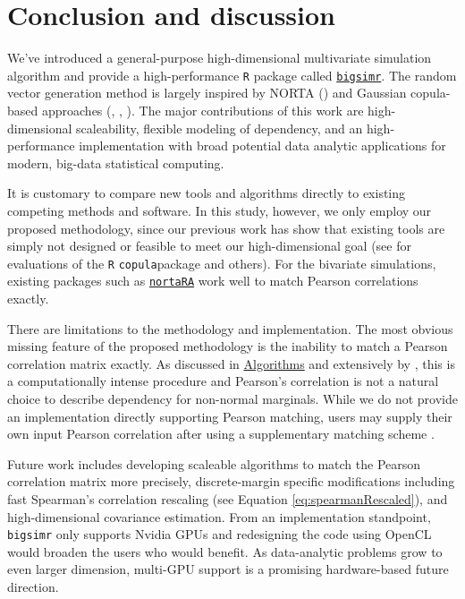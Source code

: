 \documentclass[]{article}
\begin{document}
\hypertarget{discussion}{%
\section{Conclusion and discussion}\label{discussion}}

We've introduced a general-purpose high-dimensional multivariate simulation algorithm and provide a high-performance \texttt{R} package called \href{https://schisslergroup.github.io/bigsimr/}{\texttt{bigsimr}}.
The random vector generation method is largely inspired by NORTA (\citet{Cario1997}) and Gaussian copula-based approaches (\citet{MB13}, \citet{BF17}, \citet{Xia17}).
The major contributions of this work are high-dimensional scaleability, flexible modeling of dependency, and an high-performance implementation with broad potential data analytic applications for modern, big-data statistical computing.

It is customary to compare new tools and algorithms directly to existing competing methods and software.
In this study, however, we only employ our proposed methodology, since our previous work has show that existing tools are simply not designed or feasible to meet our high-dimensional goal (see \citet{Li2019gpu} for evaluations of the \texttt{R} \texttt{copula}package and others).
For the bivariate simulations, existing packages such as \href{https://github.com/cran/NORTARA/blob/master/inst/doc/NORTARA.R}{\texttt{nortaRA}} work well to match Pearson correlations exactly.

There are limitations to the methodology and implementation.
The most obvious missing feature of the proposed methodology is the inability to match a Pearson correlation matrix exactly.
As discussed in \href{algorithms}{Algorithms} and extensively by \citet{XZ19}, this is a computationally intense procedure and Pearson's correlation is not a natural choice to describe dependency for non-normal marginals.
While we do not provide an implementation directly supporting Pearson matching, users may supply their own input Pearson correlation after using a supplementary matching scheme \citep{Cario1997, XZ19}.

Future work includes developing scaleable algorithms to match the Pearson correlation matrix more precisely, discrete-margin specific modifications including fast Spearman's correlation rescaling (see Equation \eqref{eq:spearmanRescaled}), and high-dimensional covariance estimation.
From an implementation standpoint, \texttt{bigsimr} only supports Nvidia GPUs and redesigning the code using OpenCL would broaden the users who would benefit.
As data-analytic problems grow to even larger dimension, multi-GPU support is a promising hardware-based future direction.
\end{document}
